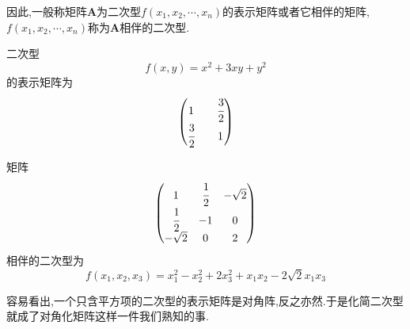 \begin{red}
    \begin{remark}
        因此,一般称矩阵$\bm{A}$为二次型$f\left(
            x_1,x_2,\cdots,x_n
        \right)$的表示矩阵或者它相伴的矩阵,$f\left(
            x_1,x_2,\cdots,x_n
        \right)$称为$\bm{A}$相伴的二次型.
    \end{remark}
\end{red}
\begin{brown}
    \begin{example}
        二次型\[
        f\left(x,y\right)=x^2+3xy+y^2
        \]的表示矩阵为\[
        \begin{pmatrix}
            1&&\cfrac{3}{2}\\\cfrac{3}{2}&&1  
        \end{pmatrix}
        \]
    \end{example}
\end{brown}
\begin{brown}
    \begin{example}
        矩阵\[
        \begin{pmatrix}
            1&\cfrac{1}{2}&-\sqrt{2}\\
            \cfrac{1}{2}&-1&0\\
            -\sqrt{2}&0&2
        \end{pmatrix}
        \]相伴的二次型为\[
        f\left(x_1,x_2,x_3\right)=x_1^2-x_2^2+2x_3^2+x_1x_2-2\sqrt{2}x_1x_3
        \]
    \end{example}
\end{brown}
\begin{red}
    \begin{remark}
        容易看出,一个只含平方项的二次型的表示矩阵是对角阵,反之亦然.于是化简二次型就成了对角化矩阵这样一件我们熟知的事.
    \end{remark}
\end{red}
